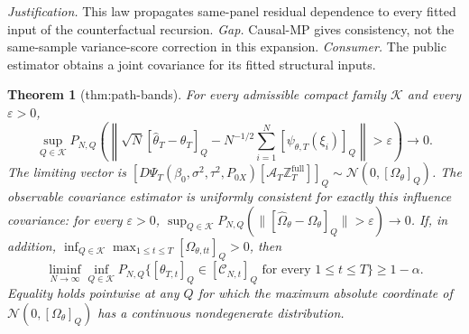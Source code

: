 \documentclass{article}
\newtheorem{theorem}{Theorem}
\begin{document}
\par\smallskip\noindent \textit{Justification.} This law propagates same-panel residual dependence to every fitted input of the counterfactual recursion. \textit{Gap.} Causal-MP gives consistency, not the same-sample variance-score correction in this expansion. \textit{Consumer.} The public estimator obtains a joint covariance for its fitted structural inputs.

\begin{theorem}[thm:path-bands]\label{thm:path-bands}
For every admissible compact family \(\mathcal K\) and every \(\varepsilon>0\),
\[
 \sup_{Q\in\mathcal K}P_{N,Q}\!\left(\left\|\sqrt N[\widehat\theta_T-\theta_T]_Q-N^{-1/2}\sum_{i=1}^N[\psi_{\theta,T}(\xi_i)]_Q\right\|>\varepsilon\right)\to0.
\]
The limiting vector is \([D\Psi_T(\beta_0,\sigma^2,\tau^2,P_{0X})[\mathcal A_T\mathbb Z_T^{\mathrm{full}}]]_Q\sim\mathcal N(0,[\Omega_\theta]_Q)\).  The observable covariance estimator is uniformly consistent for exactly this influence covariance: for every \(\varepsilon>0\), \(\sup_{Q\in\mathcal K}P_{N,Q}(\|[\widehat\Omega_\theta-\Omega_\theta]_Q\|>\varepsilon)\to0\).  If, in addition, \(\inf_{Q\in\mathcal K}\max_{1\le t\le T}[\Omega_{\theta,tt}]_Q>0\), then
\[
 \liminf_{N\to\infty}\inf_{Q\in\mathcal K}P_{N,Q}\{[\theta_{T,t}]_Q\in[\mathcal C_{N,t}]_Q\text{ for every }1\le t\le T\}\ge1-\alpha.
\]
Equality holds pointwise at any \(Q\) for which the maximum absolute coordinate of \(\mathcal N(0,[\Omega_\theta]_Q)\) has a continuous nondegenerate distribution.
\end{theorem}
\end{document}
